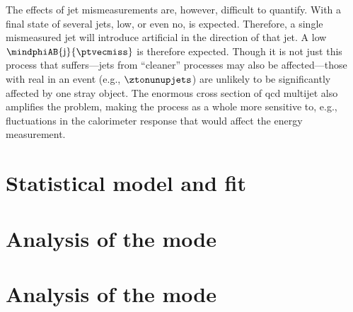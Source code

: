 The effects of \gls{jet} mismeasurements are, however, difficult to quantify. With a final state of several \glspl{jet}, low, or even no, \ptmiss is expected. Therefore, a single mismeasured \gls{jet} will introduce artificial \ptvecmiss in the direction of that jet. A low $\mindphiAB{\mathrm{j}}{\ptvecmiss}$ is therefore expected. Though it is not just this process that suffers---\glspl{jet} from ``cleaner'' processes may also be affected---those with real \ptmiss in an event (e.g., $\ztonunupjets$) are unlikely to be significantly affected by one stray object. The enormous cross section of \acrshort{qcd} multijet also amplifies the problem, making the process as a whole more sensitive to, e.g., fluctuations in the calorimeter response that would affect the energy measurement.




\section{Statistical model and fit}
\label{sec:htoinv_satistical_treatment}





\section{Analysis of the \texorpdfstring{\ttH}{ttH} mode}
\label{sec:htoinv_analysis_ttH}





\section{Analysis of the \texorpdfstring{\VH}{VH} mode}
\label{sec:htoinv_analysis_VH}





